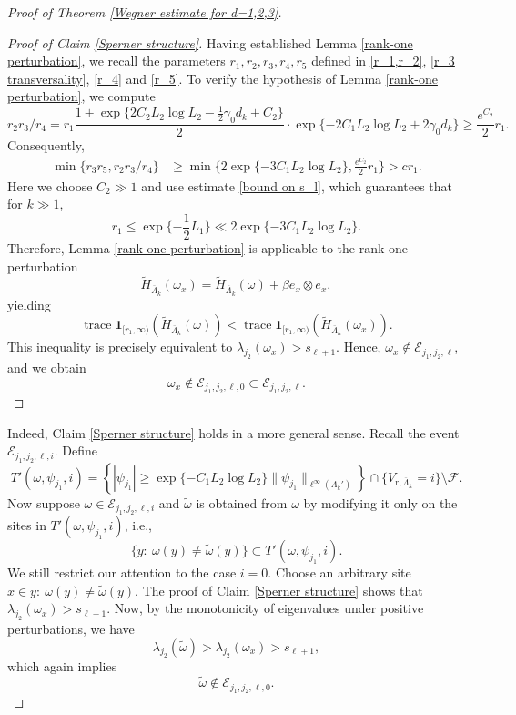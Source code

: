\documentclass[11pt,reqno,UTF8,twoside]{amsart}
\newcommand{\barLambda}{\overline{\Lambda}}
\newcommand{\mcE}{\mathcal{E}}
\newcommand{\mcF}{\mathcal{F}}
\theoremstyle{definition}
\numberwithin{equation}{section}
\begin{document}
\begin{proof}[Proof of Theorem \ref{Wegner estimate for d=1,2,3}]
\begin{proof}[Proof of Claim \ref{Sperner structure}]
Having established Lemma \ref{rank-one perturbation}, we recall the parameters $r_1,r_2,r_3,r_4,r_5$ defined in \eqref{r_1,r_2}, \eqref{r_3 transversality}, \eqref{r_4} and \eqref{r_5}. To verify the hypothesis of Lemma \ref{rank-one perturbation}, we compute
\begin{equation*}
  r_2 r_3/r_4 = r_1 \frac{1+\exp\{2C_2L_2\log L_2-\frac{1}{2}\gamma_0 d_k+C_2\}}{2}\cdot \exp\{-2C_1L_2\log L_2+2\gamma_0 d_k\} \geq \frac{e^{C_2}}{2} r_1.
\end{equation*}
Consequently,
\begin{align*}
  \min \{r_3 r_5,r_2 r_3/r_4\} & \geq  \min\{ 2\exp\{-3C_1 L_2 \log L_2\}    , \frac{e^{C_2}}{2} r_1 \} >c r_1.
\end{align*}
Here we choose $C_2\gg1$  and use estimate \eqref{bound on s_l}, which guarantees that for $k\gg1$,
\[r_1\leq \exp\{-\frac{1}{2}L_1\} \ll 2\exp\{-3C_1 L_2 \log L_2\}  .\]
Therefore, Lemma \ref{rank-one perturbation} is applicable to the rank-one perturbation
\[\widetilde{H}_{\barLambda_k}(\omega_x)=\widetilde{H}_{\barLambda_k}(\omega) +\beta e_x\otimes e_x,\]
yielding
\[
\operatorname{trace} \mathbf{1}_{[r_1, \infty)}(\widetilde{H}_{\barLambda_k}(\omega)) < \operatorname{trace} \mathbf{1}_{[r_1, \infty)}(\widetilde{H}_{\barLambda_k}(\omega_x)).
\]
This inequality is precisely equivalent to $\lambda_{j_2}(\omega_x) > s_{\ell+1}$. Hence, $\omega_x \notin \mcE_{j_1,j_2,\ell}$, and we obtain
\[\omega_x \notin \mcE_{j_1,j_2,\ell,0} \subset \mcE_{j_1,j_2,\ell}.\]

\end{proof}


Indeed, Claim \ref{Sperner structure} holds in a more general sense. Recall the event  $\mcE_{j_1,j_2,\ell,i}$. Define
\[T'(\omega,\psi_{j_1},i)= \left\{|\psi_{j_1}|\geq \exp\{-C_1L_2\log L_2\}\|\psi_{j_1}\|_{\ell^{\infty}(\Lambda_k')}\right\} \cap \{V_{\text{r},\barLambda_k}=i\}\setminus \mcF  .\] 
Now suppose $\omega\in \mcE_{j_1,j_2,\ell,i}$ and $\widetilde{\omega}$ is obtained from $\omega$ by modifying it only on the sites in $T'(\omega,\psi_{j_1},i)$,  i.e.,
\[\{y:\ \omega (y) \neq \widetilde{\omega}(y)\} \subset T'(\omega,\psi_{j_1},i) .\]
We still restrict our attention to the case $i=0$. Choose an arbitrary site $x \in {y:\ \omega (y) \neq \widetilde{\omega}(y)}$. The proof of Claim \ref{Sperner structure} shows that $\lambda_{j_2}(\omega_x) > s_{\ell+1}$. Now, by the monotonicity of eigenvalues under positive perturbations, we have
\[\lambda_{j_2}(\widetilde{\omega})>\lambda_{j_2}(\omega_x)>s_{\ell+1},\]
which again implies 
\begin{equation}\label{general Sperner structure}
  \widetilde{\omega}\notin \mcE_{j_1,j_2,\ell,0}.
\end{equation}


\end{proof}
\end{document}
